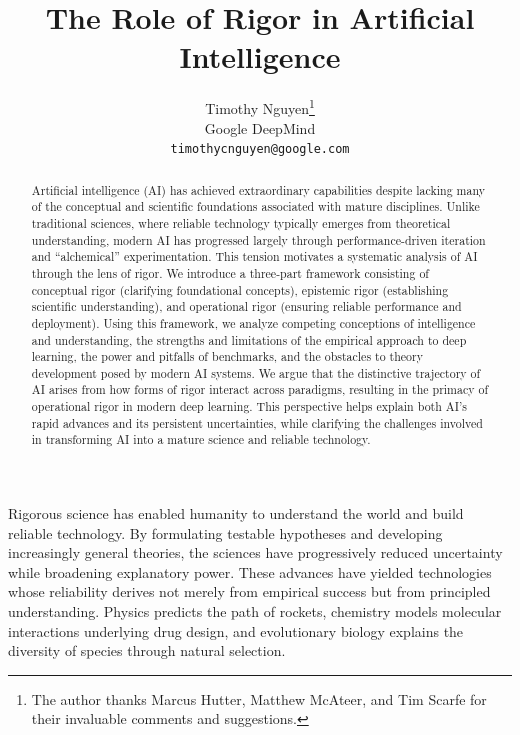 \documentclass{article}
\title{The Role of Rigor in Artificial Intelligence}
\author{Timothy Nguyen\footnote{The author thanks Marcus Hutter, Matthew McAteer, and Tim Scarfe for their invaluable comments and suggestions.}\\[.5ex]
 Google DeepMind\\[.5ex]
  \texttt{timothycnguyen@google.com}}
\date{}
\begin{document}
\maketitle

\begin{abstract}
Artificial intelligence (AI) has achieved extraordinary capabilities despite lacking many of the conceptual and scientific foundations associated with mature disciplines.
Unlike traditional sciences, where reliable technology typically emerges from theoretical understanding, modern AI has progressed largely through performance-driven iteration and ``alchemical'' experimentation.
This tension motivates a systematic analysis of AI through the lens of rigor.
We introduce a three-part framework consisting of conceptual rigor (clarifying foundational concepts), epistemic rigor (establishing scientific understanding), and operational rigor (ensuring reliable performance and deployment).
Using this framework, we analyze competing conceptions of intelligence and understanding, the strengths and limitations of the empirical approach to deep learning, the power and pitfalls of benchmarks, and the obstacles to theory development posed by modern AI systems.
We argue that the distinctive trajectory of AI arises from how forms of rigor interact across paradigms, resulting in the primacy of operational rigor in modern deep learning.
This perspective helps explain both AI's rapid advances and its persistent uncertainties, while clarifying the challenges involved in transforming AI into a mature science and reliable technology.
\end{abstract}


Rigorous science has enabled humanity to understand the world and build reliable technology.
By formulating testable hypotheses and developing increasingly general theories, the sciences have progressively reduced uncertainty while broadening explanatory power.
These advances have yielded technologies whose reliability derives not merely from empirical success but from principled understanding.
Physics predicts the path of rockets, chemistry models molecular interactions underlying drug design, and evolutionary biology explains the diversity of species through natural selection.
\end{document}
